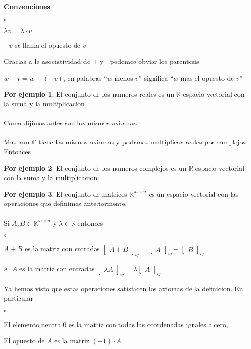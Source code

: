 \documentclass{article}
\theoremstyle{definition}
\theoremstyle{definition}
\newtheorem*{ej}{Por ejemplo}
\theoremstyle{remark}
\begin{document}
\pagebreak

\textbf{Convenciones}
\begin{list}{$\circ$}{}  
\item $\lambda v = \lambda \cdot v$ 
\item $-v$ se llama el opuesto de $v$
\item Gracias a la asociatividad de $+$ y $\cdot $ podemos obviar los parentesis
\item $w-v=w+(-v)$, en palabras ``$w$ menos $v$'' significa ``$w$ mas el opuesto de $v$''
\end{list}
\begin{ej}
El conjunto de los numeros reales es un $\mathbb{R}$-espacio vectorial con la suma y la multiplicacion \\\\
Como dijimos antes son los mismos axiomas. \\\\
Mas aun $\mathbb{C}$ tiene los mismos axiomas y podemos multiplicar reales por complejos. Entonces 
\end{ej}
\begin{ej}
  El conjunto de los numeros complejos es un $\mathbb{R}$-espacio vectorial con la suma y la multiplicacion.
\end{ej}
\begin{ej}
  El conjunto de matrices $\mathbb{K}^{m \times n}$ es un espacio vectorial con las operaciones que definimos anteriormente.\\\\
  Si $A,B \in \mathbb{K}^{m \times n}$ y $\lambda \in \mathbb{K}$ entonces 
\begin{list}{$\circ$}{}  
\item $A+B$ es la matriz con entradas $\begin{bmatrix}A+B\end{bmatrix}_{ij}=\begin{bmatrix}A\end{bmatrix}_{ij}+\begin{bmatrix}B\end{bmatrix}_{ij}$ 
\item $\lambda \cdot A$ es la matriz con entradas $\begin{bmatrix}\lambda A \end{bmatrix}_{ij}=\lambda \begin{bmatrix} A \end{bmatrix}_{ij}$
\end{list}
Ya hemos visto que estas operaciones satisfacen los axiomas de la definicion. En particular 
\begin{list}{$\circ$}{}  
\item  El elemento neutro $0$ es la matriz con todas las coordenadas iguales a cero, 
\item El opuesto de $A$ es la matriz $(-1)\cdot A$
\end{list}
\end{ej}
\end{document}

